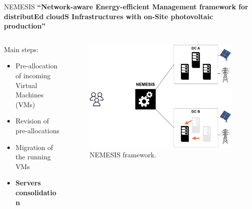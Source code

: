 \documentclass[Ligatures=TeX,table,svgnames,usetotalslideindicator,compress,10pt,aspectratio=169]{beamer}
\begin{document}
\begin{frame}{NEMESIS}
  \textbf {``\alert{N}etwork-aware \alert{E}nergy-efficient
    \alert{M}anagement framework for distribut\alert{E}d cloud\alert{S} \alert{I}nfrastructures with on-\alert{S}ite photovoltaic production''}
\begin{columns}        
    \begin{column}{0.4\textwidth}
Main steps:
\small
\begin{itemize}
    \item Pre-allocation of incoming Virtual Machines (VMs)
    \item Revision of pre-allocations
    \item Migration of the running VMs
    \item \alert{\textbf{Servers consolidation}}
\end{itemize}
\end{column}

\begin{column}{0.6\textwidth}
      \begin{figure}[!h]
        \centering
        \includegraphics[width=.85\textwidth]{images/nemesis_server_consolidation_2.pdf}
        \caption{NEMESIS framework.}
      \end{figure}
    \end{column}        

\end{columns}
\end{frame}
\end{document}
